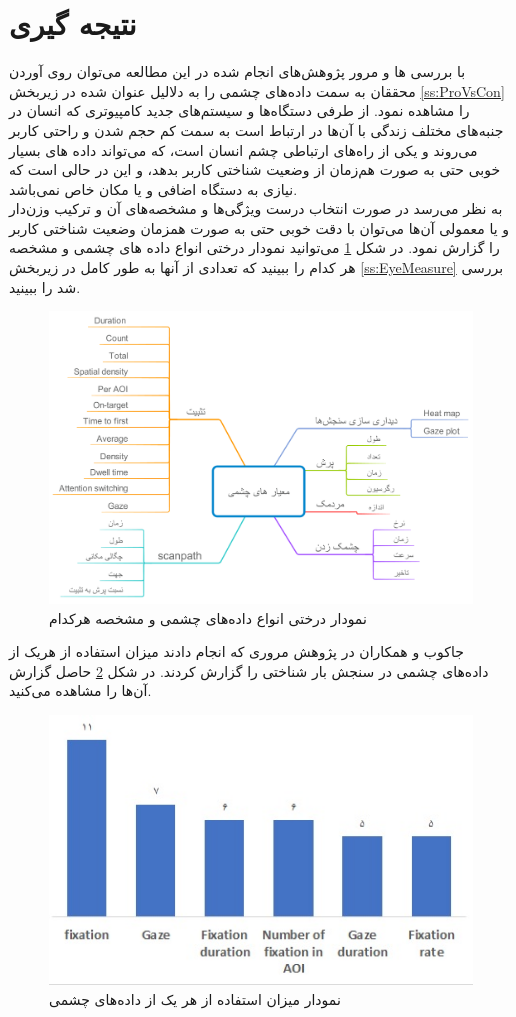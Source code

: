 \section{نتیجه گیری}
\label{s:conclusion}
با بررسی ها و مرور پژوهش‌های انجام شده در این مطالعه می‌توان روی آوردن محققان به سمت داده‌های چشمی را به دلالیل عنوان شده در زیربخش
\ref{ss:ProVsCon}
را مشاهده نمود. از طرفی دستگاه‌ها و سیستم‌های جدید کامپیوتری که انسان در جنبه‌های مختلف زندگی با آن‌ها در ارتباط است به سمت کم حجم شدن و راحتی کاربر می‌روند و یکی از راه‌های ارتباطی چشم انسان است، که می‌تواند داده های بسیار خوبی حتی به صورت هم‌زمان از وضعیت شناختی کاربر بدهد، و این در حالی است که نیازی به دستگاه اضافی و یا مکان خاص نمی‌باشد.
\\
به نظر می‌رسد در صورت انتخاب درست ویژگی‌ها و مشخصه‌های آن  و ترکیب وزن‌دار و یا معمولی آن‌ها می‌توان با دقت خوبی حتی به صورت همزمان وضعیت شناختی کاربر را گزارش نمود.
در شکل
\ref{fig:eyetree}
می‌توانید نمودار درختی انواع داده های چشمی و مشخصه هر کدام را ببینید که تعدادی از آنها به طور کامل در زیربخش
\ref{ss:EyeMeasure}
بررسی شد را ببینید.

\begin{figure}[htbp]
	\centering
	\includegraphics[width=\linewidth]{figures/eye_tree}
	\caption[نمودار درختی داده‌های چشمی]{نمودار درختی انواع داده‌های چشمی و مشخصه هرکدام}
	\label{fig:eyetree}
\end{figure}
جاکوب و همکاران
\cite{Hyona2003}
در پژوهش مروری که انجام دادند میزان استفاده از هریک از داده‌های چشمی در سنجش بار شناختی را گزارش کردند.
در شکل 
\ref{fig:eyedataused}
حاصل گزارش آن‌ها را مشاهده می‌کنید.
\begin{figure}[htbp]
	\centering
	\includegraphics[width=0.7\linewidth]{figures/eyedata_used}
	\caption[میزان استفاده از داده‌های چشمی]{نمودار میزان استفاده از هر یک از داده‌های چشمی}
	\label{fig:eyedataused}
\end{figure}
